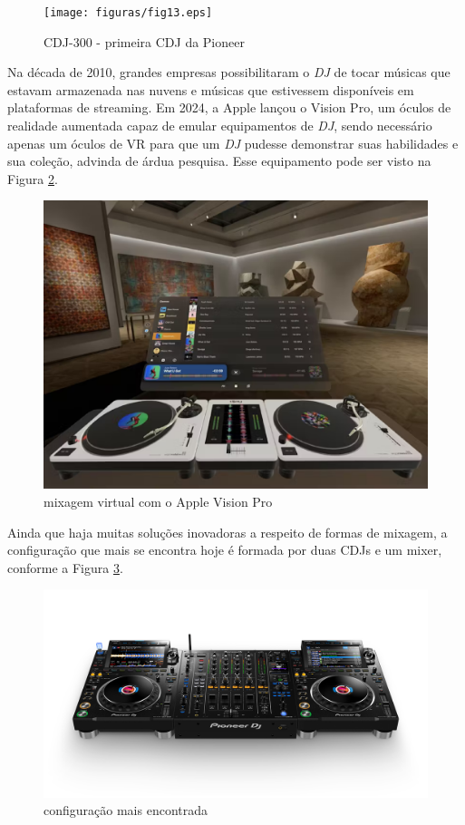 \begin{figure}[h]
	\centering
    \texttt{[image: figuras/fig13.eps]}
	\caption{CDJ-300 - primeira CDJ da Pioneer \cite{cdj300}}
	\label{fig13}
\end{figure}

\par
Na década de 2010, grandes empresas possibilitaram o \textit{DJ} de tocar músicas que estavam armazenada nas nuvens e músicas que estivessem disponíveis em plataformas de streaming. Em 2024, a Apple lançou o Vision Pro, um óculos de realidade aumentada capaz de emular equipamentos de \textit{DJ}, sendo necessário apenas um óculos de VR para que um \textit{DJ} pudesse demonstrar suas habilidades e sua coleção, advinda de árdua pesquisa. Esse equipamento pode ser visto na Figura \ref{fig16}.

\begin{figure}[h]
	\centering
    \includegraphics[scale=0.3]{figuras/fig16.eps}
	\caption{mixagem virtual com o Apple Vision Pro \cite{macmagazineDesenvolvedorFala}}
	\label{fig16}
\end{figure}

Ainda que haja muitas soluções inovadoras a respeito de formas de mixagem, a configuração que mais se encontra hoje é formada por duas CDJs e um mixer, conforme a Figura \ref{fig17}.

\begin{figure}[h]
	\centering
    \includegraphics[scale=0.3]{figuras/fig17.png}
	\caption{configuração mais encontrada \cite{pioneerdjDJMA94channel}}
	\label{fig17}
\end{figure}

